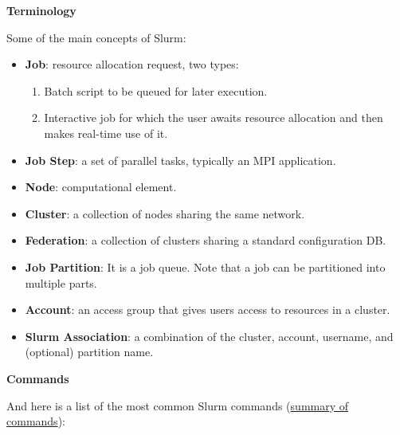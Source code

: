 \begin{flushleft}
    \textcolor{Green3}{ \textbf{Terminology}}
\end{flushleft}
Some of the main concepts of Slurm:
\begin{itemize}
    \item \textbf{Job}: resource allocation request, two types:
    \begin{enumerate}
        \item Batch script to be queued for later execution.
        \item Interactive job for which the user awaits resource allocation and then makes real-time use of it.
    \end{enumerate}

    \item \textbf{Job Step}: a set of parallel tasks, typically an MPI application.

    \item \textbf{Node}: computational element.
    
    \item \textbf{Cluster}: a collection of nodes sharing the same network.
    
    \item \textbf{Federation}: a collection of clusters sharing a standard configuration DB.
    
    \item \textbf{Job Partition}: It is a job queue. Note that a job can be partitioned into multiple parts.
    
    \item \textbf{Account}: an access group that gives users access to resources in a cluster.
    
    \item \textbf{Slurm Association}: a combination of the cluster, account, username, and (optional) partition name.
\end{itemize}
\begin{flushleft}
    \textcolor{Green3}{ \textbf{Commands}}
\end{flushleft}
And here is a list of the most common Slurm commands (\href{https://slurm.schedmd.com/pdfs/summary.pdf}{summary of commands}):
